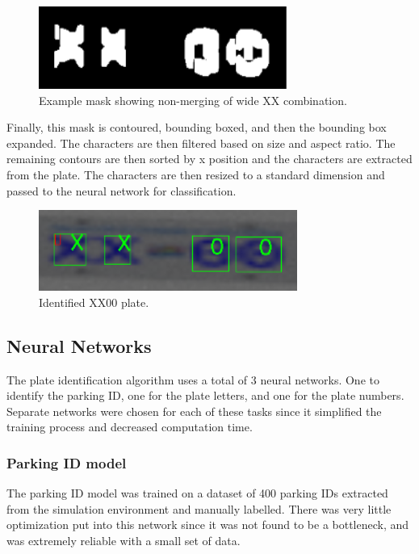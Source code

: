 \documentclass[titlepage, twocolumn]{article}
\begin{document}
\begin{figure}
\centering
\includegraphics[width=0.8\linewidth]{XX00 mask.png}
\caption{Example mask showing non-merging of wide XX combination.}
\label{fig:XX00mask}
\end{figure}

Finally, this mask is contoured, bounding boxed, and then the bounding box expanded. The characters are then filtered based on size and aspect ratio. The remaining contours are then sorted by x position and the characters are extracted from the plate. The characters are then resized to a standard dimension and passed to the neural network for classification.

\begin{figure}
\centering
\includegraphics[width=0.8\linewidth]{XX00 identified.png}
\caption{Identified XX00 plate.}
\label{fig:XX00identified}
\end{figure}

\subsection{Neural Networks}

The plate identification algorithm uses a total of 3 neural networks. One to identify the parking ID, one for the plate letters, and one for the plate numbers. Separate networks were chosen for each of these tasks since it simplified the training process and decreased computation time. 

\subsubsection{Parking ID model}

The parking ID model was trained on a dataset of 400 parking IDs extracted from the simulation environment and manually labelled. There was very little optimization put into this network since it was not found to be a bottleneck, and was extremely reliable with a small set of data.
\end{document}
